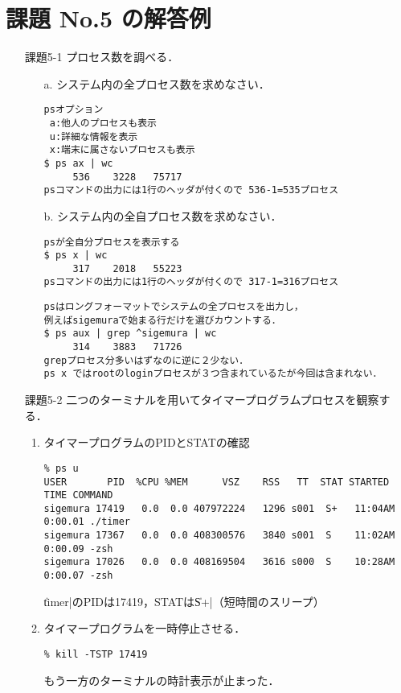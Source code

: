 \documentclass[a4j,twcolumn,11pt,nomag]{ltjarticle}      %
\begin{document}
\onecolumn

\section*{課題 No.5 の解答例}
\begin{itemize}
\item[課題5-1]
  プロセス数を調べる．
  \begin{enumerate}
  \item[a.] システム内の全プロセス数を求めなさい．
\begin{lstlisting}
psオプション
 a:他人のプロセスも表示
 u:詳細な情報を表示
 x:端末に属さないプロセスも表示
$ ps ax | wc
     536    3228   75717
psコマンドの出力には1行のヘッダが付くので 536-1=535プロセス
\end{lstlisting}
  \item[b.] システム内の全自プロセス数を求めなさい．
\begin{lstlisting}
psが全自分プロセスを表示する
$ ps x | wc
     317    2018   55223
psコマンドの出力には1行のヘッダが付くので 317-1=316プロセス
\end{lstlisting}
\begin{lstlisting}
psはロングフォーマットでシステムの全プロセスを出力し，
例えばsigemuraで始まる行だけを選びカウントする．
$ ps aux | grep ^sigemura | wc
     314    3883   71726
grepプロセス分多いはずなのに逆に２少ない．
ps x ではrootのloginプロセスが３つ含まれているたが今回は含まれない．
\end{lstlisting}
  \end{enumerate}

\item[課題5-2]
二つのターミナルを用いてタイマープログラムプロセスを観察する．
  \begin{enumerate}
  \item タイマープログラムのPIDとSTATの確認
\lstset{basicstyle=\footnotesize\ttfamily}
\begin{lstlisting}
% ps u
USER       PID  %CPU %MEM      VSZ    RSS   TT  STAT STARTED      TIME COMMAND
sigemura 17419   0.0  0.0 407972224   1296 s001  S+   11:04AM   0:00.01 ./timer
sigemura 17367   0.0  0.0 408300576   3840 s001  S    11:02AM   0:00.09 -zsh
sigemura 17026   0.0  0.0 408169504   3616 s000  S    10:28AM   0:00.07 -zsh
\end{lstlisting}
\|timer|のPIDは17419，STATは\|S+|（短時間のスリープ）

  \item タイマープログラムを一時停止させる．
\lstset{basicstyle=\small\ttfamily}
\begin{lstlisting}
% kill -TSTP 17419
\end{lstlisting}
もう一方のターミナルの時計表示が止まった．


\end{enumerate}
\end{itemize}
\end{document}
